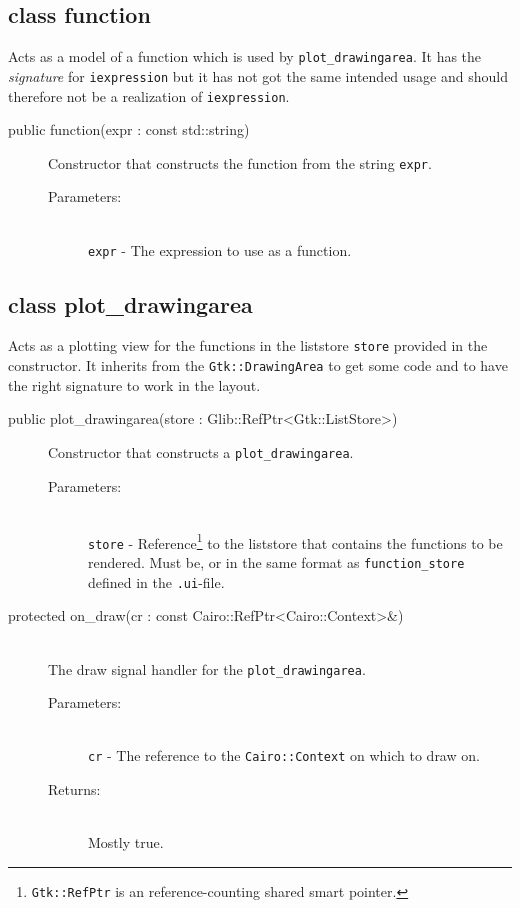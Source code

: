 \documentclass[a4paper,11pt]{kth-mag}
\begin{document}
\subsection{class function}
Acts as a model of a function which is used by \texttt{plot\_drawingarea}.
It has the \emph{signature} for \texttt{iexpression} but it has not got the
same intended usage and should therefore not be a realization of
\texttt{iexpression}.

\begin{description}
    \item[public function(expr : const std::string)] Constructor 
    that constructs the function from the string \texttt{expr}.
    \begin{description}
        \item[Parameters:]~\\
            \verb+expr+ - The expression to use as a function.
    \end{description}
\end{description}

\subsection{class plot\_drawingarea}
Acts as a plotting view for the functions in the liststore \texttt{store}
provided in the constructor. It inherits from the \texttt{Gtk::DrawingArea} to
get some code and to have the right signature to work in the layout.

\begin{description}
    \item[public plot\_drawingarea(store : Glib::RefPtr<Gtk::ListStore>)] Constructor 
    that constructs a \texttt{plot\_drawingarea}. 
    \begin{description}
        \item[Parameters:]~\\
            \verb+store+ - Reference\footnote{\texttt{Gtk::RefPtr} is an
            reference-counting shared smart pointer.} to the liststore that contains the
            functions to be rendered. Must be, or in the same format as
            \texttt{function\_store} defined in the \texttt{.ui}-file.
    \end{description}
\end{description}

\begin{description}
   \item[protected on\_draw(cr : const Cairo::RefPtr<Cairo::Context>\&)]~\\
   The draw signal handler for the \texttt{plot\_drawingarea}.
   \begin{description}
        \item[Parameters:]~\\
            \verb+cr+ - The reference to the \texttt{Cairo::Context} on which to draw on.
        \item[Returns:]~\\
            Mostly true.
    \end{description}
\end{description}
\end{document}
